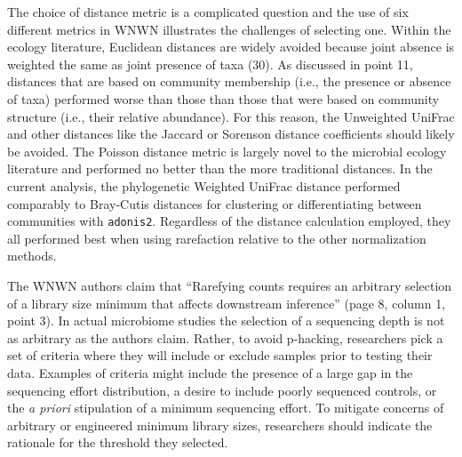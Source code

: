 \documentclass[
]{article}
\begin{document}
The choice of distance metric is a complicated question and the use of
six different metrics in WNWN illustrates the challenges of selecting
one. Within the ecology literature, Euclidean distances are widely
avoided because joint absence is weighted the same as joint presence of
taxa (30). As discussed in point 11, distances that are based on
community membership (i.e., the presence or absence of taxa) performed
worse than those than those that were based on community structure
(i.e., their relative abundance). For this reason, the Unweighted
UniFrac and other distances like the Jaccard or Sorenson distance
coefficients should likely be avoided. The Poisson distance metric is
largely novel to the microbial ecology literature and performed no
better than the more traditional distances. In the current analysis, the
phylogenetic Weighted UniFrac distance performed comparably to
Bray-Cutis distances for clustering or differentiating between
communities with \texttt{adonis2}. Regardless of the distance
calculation employed, they all performed best when using rarefaction
relative to the other normalization methods.

The WNWN authors claim that ``Rarefying counts requires an arbitrary
selection of a library size minimum that affects downstream inference''
(page 8, column 1, point 3). In actual microbiome studies the selection
of a sequencing depth is not as arbitrary as the authors claim. Rather,
to avoid p-hacking, researchers pick a set of criteria where they will
include or exclude samples prior to testing their data. Examples of
criteria might include the presence of a large gap in the sequencing
effort distribution, a desire to include poorly sequenced controls, or
the \emph{a priori} stipulation of a minimum sequencing effort. To
mitigate concerns of arbitrary or engineered minimum library sizes,
researchers should indicate the rationale for the threshold they
selected.
\end{document}

